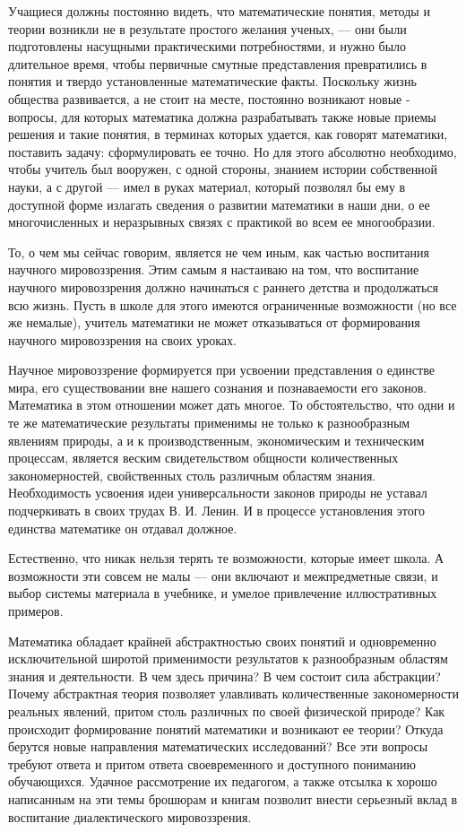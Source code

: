 \documentclass[12pt, a4paper, openany]{book}
\begin{document}
Учащиеся должны постоянно видеть, что  математические понятия, методы и теории возникли не в результате простого желания ученых, — они были подготовлены  насущными практическими потребностями, и нужно было длительное время, чтобы первичные смутные  представления превратились в понятия и твердо установленные  математические факты. Поскольку жизнь общества  развивается, а не стоит на месте, постоянно возникают новые - вопросы, для которых математика должна разрабатывать также новые приемы решения и такие понятия, в терминах которых удается, как говорят математики, поставить  задачу: сформулировать ее точно. Но для этого абсолютно  необходимо, чтобы учитель был вооружен, с одной стороны, знанием истории собственной науки, а с другой — имел в руках материал, который позволял бы ему в доступной форме излагать сведения о развитии математики в наши дни, о ее многочисленных и неразрывных связях с  практикой во всем ее многообразии. 

То, о чем мы сейчас говорим, является не чем иным, как частью воспитания научного мировоззрения. Этим самым я настаиваю на том, что воспитание научного мировоззрения должно начинаться с раннего детства и продолжаться всю жизнь. Пусть в школе для этого имеются ограниченные возможности (но все же немалые), учитель математики не может отказываться от формирования научного  мировоззрения на своих уроках. 

Научное мировоззрение формируется при усвоении представления о единстве мира, его существовании вне нашего сознания и познаваемости его законов. Математика в этом отношении может дать многое. То обстоятельство, что одни и те же математические результаты применимы не только к разнообразным явлениям природы, а и к  производственным, экономическим и техническим процессам,  является веским свидетельством общности количественных закономерностей, свойственных столь различным областям знания. Необходимость усвоения идеи универсальности законов природы не уставал подчеркивать в своих трудах В. И. Ленин. И в процессе установления этого единства математике он отдавал должное. 

Естественно, что никак нельзя терять те возможности, которые имеет школа. А возможности эти совсем не малы — они включают и межпредметные связи, и выбор системы  материала в учебнике, и умелое привлечение  иллюстративных примеров. 

Математика обладает крайней абстрактностью своих понятий и одновременно исключительной широтой  применимости результатов к разнообразным областям знания и деятельности. В чем здесь причина? В чем состоит сила абстракции? Почему абстрактная теория позволяет  улавливать количественные закономерности реальных явлений, притом столь различных по своей физической природе? Как происходит формирование понятий математики и  возникают ее теории? Откуда берутся новые направления  математических исследований? Все эти вопросы требуют  ответа и притом ответа своевременного и доступного  пониманию обучающихся. Удачное рассмотрение их педагогом, а также отсылка к хорошо написанным на эти темы  брошюрам и книгам позволит внести серьезный вклад в  воспитание диалектического мировоззрения. 
\end{document}
